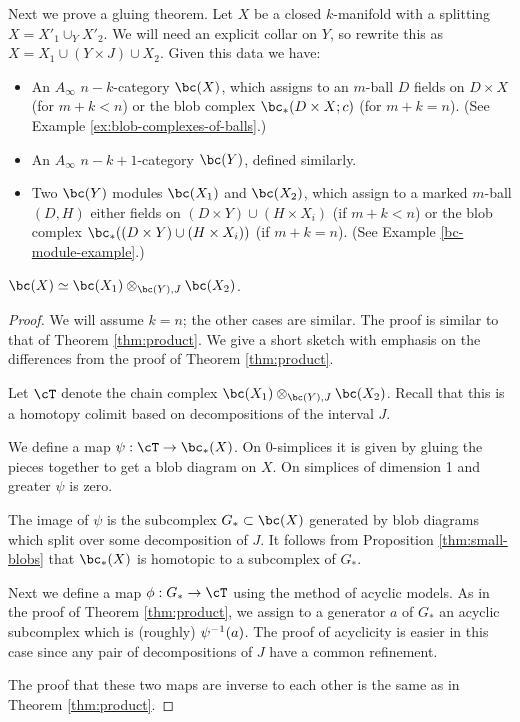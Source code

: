 Next we prove a gluing theorem.
Let $X$ be a closed $k$-manifold with a splitting $X = X'_1\cup_Y X'_2$.
We will need an explicit collar on $Y$, so rewrite this as
$X = X_1\cup (Y\times J) \cup X_2$.
Given this data we have:
\begin{itemize}
\item An $A_\infty$ $n{-}k$-category $\bc(X)$, which assigns to an $m$-ball
$D$ fields on $D\times X$ (for $m+k < n$) or the blob complex $\bc_*(D\times X; c)$
(for $m+k = n$).
(See Example \ref{ex:blob-complexes-of-balls}.)
\item An $A_\infty$ $n{-}k{+}1$-category $\bc(Y)$, defined similarly.
\item Two $\bc(Y)$ modules $\bc(X_1)$ and $\bc(X_2)$, which assign to a marked
$m$-ball $(D, H)$ either fields on $(D\times Y) \cup (H\times X_i)$ (if $m+k < n$)
or the blob complex $\bc_*((D\times Y) \cup (H\times X_i))$ (if $m+k = n$).
(See Example \ref{bc-module-example}.)
\end{itemize}


\begin{thm}
\label{thm:gluing}
$\bc(X) \simeq \bc(X_1) \otimes_{\bc(Y), J} \bc(X_2)$.
\end{thm}

\begin{proof}
We will assume $k=n$; the other cases are similar.
The proof is similar to that of Theorem \ref{thm:product}.
We give a short sketch with emphasis on the differences from 
the proof of Theorem \ref{thm:product}.

Let $\cT$ denote the chain complex $\bc(X_1) \otimes_{\bc(Y), J} \bc(X_2)$.
Recall that this is a homotopy colimit based on decompositions of the interval $J$.

We define a map $\psi:\cT\to \bc_*(X)$.
On 0-simplices it is given
by gluing the pieces together to get a blob diagram on $X$.
On simplices of dimension 1 and greater $\psi$ is zero.

The image of $\psi$ is the subcomplex $G_*\sub \bc(X)$ generated by blob diagrams which split
over some decomposition of $J$.
It follows from Proposition \ref{thm:small-blobs} that $\bc_*(X)$ is homotopic to 
a subcomplex of $G_*$. 

Next we define a map $\phi:G_*\to \cT$ using the method of acyclic models.
As in the proof of Theorem \ref{thm:product}, we assign to a generator $a$ of $G_*$
an acyclic subcomplex which is (roughly) $\psi^{-1}(a)$.
The proof of acyclicity is easier in this case since any pair of decompositions of $J$ have
a common refinement.

The proof that these two maps are inverse to each other is the same as in
Theorem \ref{thm:product}.
\end{proof}


